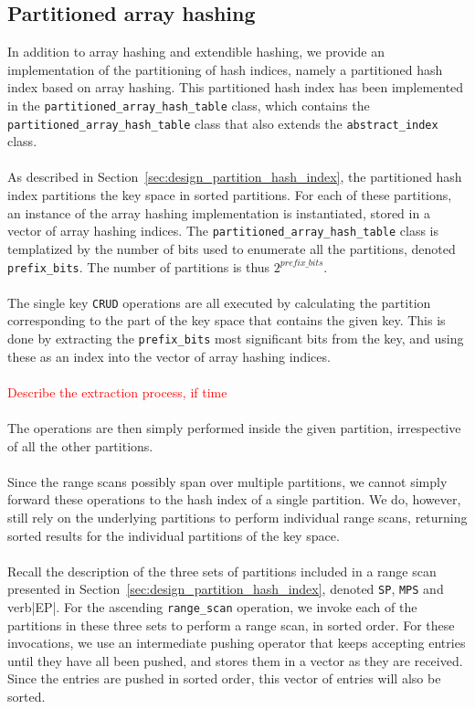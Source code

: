 \documentclass[11pt]{report} %
\begin{document}
\subsection{Partitioned array hashing}
\label{subsec:implementation_partitioned_array_hashing}
In addition to array hashing and extendible hashing, we provide an implementation of the partitioning of hash indices, namely a partitioned hash index based on array hashing. This partitioned hash index has been implemented in the \verb=partitioned_array_hash_table= class, which contains the \verb|partitioned_array_hash_table| class that also extends the \verb|abstract_index| class. \\
\\
As described in Section~\ref{sec:design_partition_hash_index}, the partitioned hash index partitions the key space in sorted partitions. For each of these partitions, an instance of the array hashing implementation is instantiated, stored in a vector of array hashing indices. The \verb|partitioned_array_hash_table| class is templatized by the number of bits used to enumerate all the partitions, denoted \verb|prefix_bits|. The number of partitions is thus $2^{prefix\_bits}$. \\
\\
The single key \verb|CRUD| operations are all executed by calculating the partition corresponding to the part of the key space that contains the given key. This is done by extracting the \verb|prefix_bits| most significant bits from the key, and using these as an index into the vector of array hashing indices.  \\
\\
\textcolor{red}{Describe the extraction process, if time}
\\
\\
The operations are then simply performed inside the given partition, irrespective of all the other partitions. \\
\\
Since the range scans possibly span over multiple partitions, we cannot simply forward these operations to the hash index of a single partition. We do, however, still rely on the underlying partitions to perform individual range scans, returning sorted results for the individual partitions of the key space. \\
\\
Recall the description of the three sets of partitions included in a range scan presented in Section~\ref{sec:design_partition_hash_index}, denoted \verb|SP|, \verb|MPS| and verb|EP|. For the ascending \verb|range_scan| operation, we invoke each of the partitions in these three sets to perform a range scan, in sorted order. For these invocations, we use an intermediate pushing operator that keeps accepting entries until they have all been pushed, and stores them in a vector as they are received. Since the entries are pushed in sorted order, this vector of entries will also be sorted. \\
\end{document}
